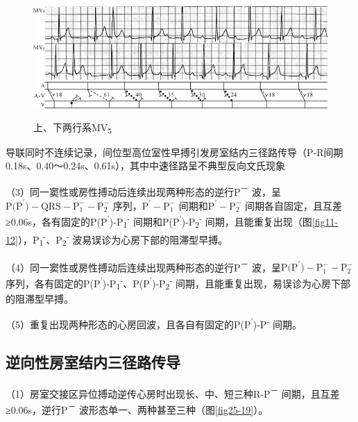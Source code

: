\begin{figure}[!htbp]
 \centering
 \includegraphics[width=5.22917in,height=1.8125in]{./images/Image00429.jpg}
 \captionsetup{justification=centering}
 \caption{上、下两行系MV\textsubscript{5}}
 \label{fig25-18}
  \end{figure} 
导联同时不连续记录，间位型高位室性早搏引发房室结内三径路传导（P-R间期0.18s、0.40～0.24s、0.61s），其中中速径路呈不典型反向文氏现象

（3）同一窦性或房性搏动后连续出现两种形态的逆行P\textsuperscript{－}
波，呈$\text{P(P}^\prime\text{)}-\text{QRS}-\text{P}_1^--\text{P}_2^-$
序列，$\text{P}^\prime-\text{P}_1^-$
间期和$\text{P}^\prime-\text{P}_2^-$
间期各自固定，且互差≥0.06s，各有固定的P(P\textsuperscript{'})-P\textsubscript{1}\textsuperscript{-}
间期和P(P\textsuperscript{'})-P\textsubscript{2}\textsuperscript{-}
间期，且能重复出现（图\ref{fig11-12}），P\textsubscript{1}\textsuperscript{-}、P\textsubscript{2}\textsuperscript{-}
波易误诊为心房下部的阻滞型早搏。

（4）同一窦性或房性搏动后连续出现两种形态的逆行P\textsuperscript{－}
波，呈$\text{P(P}^\prime\text{)}-\text{P}_1^--\text{P}_2^-$
序列，各有固定的P(P\textsuperscript{'})-P\textsubscript{1}\textsuperscript{-}、P(P\textsuperscript{'})-P\textsubscript{2}\textsuperscript{-}
间期，且能重复出现，易误诊为心房下部的阻滞型早搏。

（5）重复出现两种形态的心房回波，且各自有固定的P(P\textsuperscript{'})-P\textsuperscript{-}
间期。

\protect\hypertarget{text00032.htmlux5cux23subid386}{}{}

\subsection{逆向性房室结内三径路传导}

（1）房室交接区异位搏动逆传心房时出现长、中、短三种R-P\textsuperscript{－}
间期，且互差≥0.06s，逆行P\textsuperscript{－}
波形态单一、两种甚至三种（图\ref{fig25-19}）。

